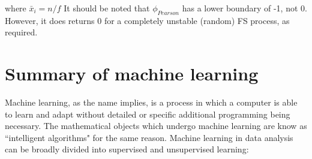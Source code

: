 \documentclass[12pt]{article}
\begin{document}
where $\bar{x}_{i} = n/f$ It should be noted that $\phi_{Pearson}$ has a lower boundary of -1, not 0. However, it does returns 0 for a completely unstable (random) FS process, as required.

\section{Summary of machine learning}
Machine learning, as the name implies, is a process in which a computer is able to learn and adapt without detailed or specific additional programming being necessary. The mathematical objects which undergo machine learning are know as ``intelligent algorithms" for the same reason. Machine learning in data analysis can be broadly divided into supervised and unsupervised learning:
\end{document}
